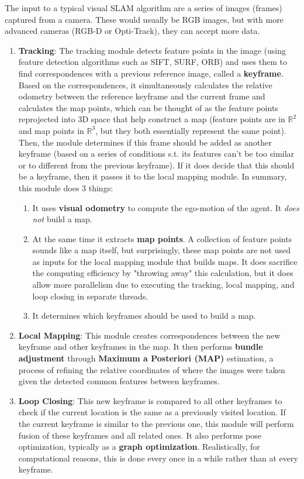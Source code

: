 \documentclass{article}
\theoremstyle{definition}
\theoremstyle{remark}
\theoremstyle{definition}
\begin{document}
The input to a typical visual SLAM algorithm are a series of images (frames) captured from a camera. These would usually be RGB images, but with more advanced cameras (RGB-D or Opti-Track), they can accept more data. 
\begin{enumerate}
    \item \textbf{Tracking}: The tracking module detects feature points in the image (using feature detection algorithms such as SIFT, SURF, ORB) and uses them to find correspondences with a previous reference image, called a \textbf{keyframe}. Based on the correspondences, it simultaneously calculates the relative odometry between the reference keyframe and the current frame and calculates the map points, which can be thought of as the feature points reprojected into 3D space that help construct a map (feature points are in $\mathbb{R}^2$ and map points in $\mathbb{R}^3$, but they both essentially represent the same point). Then, the module determines if this frame should be added as another keyframe (based on a series of conditions s.t. its features can't be too similar or to different from the previous keyframe). If it does decide that this should be a keyframe, then it passes it to the local mapping module. In summary, this module does 3 things: 
    \begin{enumerate}
        \item It uses \textbf{visual odometry} to compute the ego-motion of the agent. It \textit{does not} build a map. 
        \item At the same time it extracts \textbf{map points}. A collection of feature points sounds like a map itself, but surprisingly, these map points are not used as inputs for the local mapping module that builds maps. It does sacrifice the computing efficiency by "throwing away" this calculation, but it does allow more parallelism due to executing the tracking, local mapping, and loop closing in separate threads. 
        \item It determines which keyframes should be used to build a map. 
    \end{enumerate}
    
    \item \textbf{Local Mapping}: This module creates correspondences between the new keyframe and other keyframes in the map. It then performs \textbf{bundle adjustment} through \textbf{Maximum a Posteriori (MAP)} estimation, a process of refining the relative coordinates of where the images were taken given the detected common features between keyframes. 
    
    \item \textbf{Loop Closing}: This new keyframe is compared to all other keyframes to check if the current location is the same as a previously visited location. If the current keyframe is similar to the previous one, this module will perform fusion of these keyframes and all related ones. It also performs pose optimization, typically as a \textbf{graph optimization}. Realistically, for computational reasons, this is done every once in a while rather than at every keyframe. 
\end{enumerate}
\end{document}
